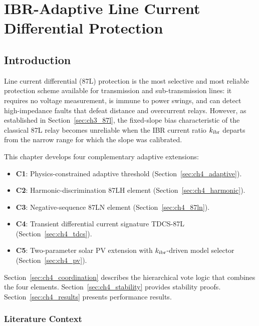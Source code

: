 \chapter{IBR-Adaptive Line Current Differential Protection}
\label{ch:line_diff}

\section{Introduction}
\label{sec:ch4_intro}

Line current differential (87L) protection is the most selective and most
reliable protection scheme available for transmission and sub-transmission
lines: it requires no voltage measurement, is immune to power swings, and
can detect high-impedance faults that defeat distance and overcurrent relays.
However, as established in Section~\ref{sec:ch3_87l}, the fixed-slope bias
characteristic of the classical 87L relay becomes unreliable when the IBR
current ratio $k_{\mathrm{ibr}}$ departs from the narrow range for which the slope
was calibrated.

This chapter develops four complementary adaptive extensions:
\begin{itemize}
\item \textbf{C1}: Physics-constrained adaptive threshold (Section~\ref{sec:ch4_adaptive}).
\item \textbf{C2}: Harmonic-discrimination 87LH element (Section~\ref{sec:ch4_harmonic}).
\item \textbf{C3}: Negative-sequence 87LN element (Section~\ref{sec:ch4_87ln}).
\item \textbf{C4}: Transient differential current signature TDCS-87L
      (Section~\ref{sec:ch4_tdcs}).
\item \textbf{C5}: Two-parameter solar PV extension with $k_{\rm ibr}$-driven
      model selector (Section~\ref{sec:ch4_pv}).
\end{itemize}

Section~\ref{sec:ch4_coordination} describes the hierarchical vote logic
that combines the four elements. Section~\ref{sec:ch4_stability} provides
stability proofs. Section~\ref{sec:ch4_results} presents performance results.

\subsection{Literature Context}

